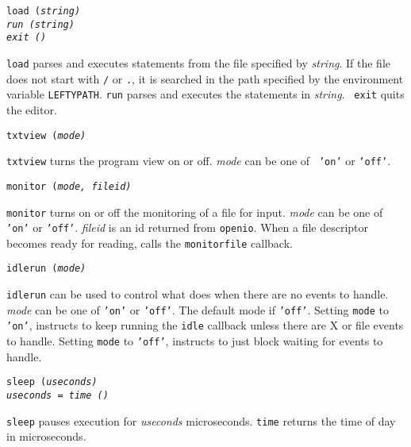 \begin{flushleft}
\tt load (\it string\tt )\\
\tt run (\it string\tt )\\
\tt exit ()\\
\end{flushleft}\vspace{-2\itemsep}
{\tt load} parses and executes {\LEFTY} statements from the file specified by
{\it string}. If the file does not start with {\tt /} or {\tt .}, it is
searched in the path specified by the environment variable {\tt LEFTYPATH}.
{\tt run} parses and executes the {\LEFTY} statements in {\it string}.  {\tt
exit} quits the editor.

\begin{flushleft}
\tt txtview (\it mode\tt )\\
\end{flushleft}\vspace{-2\itemsep}
{\tt txtview} turns the program view on or off. {\it mode} can be one of {\tt
'on'} or {\tt 'off'}.

\begin{flushleft}
\tt monitor (\it mode, fileid\tt )\\
\end{flushleft}\vspace{-2\itemsep}
{\tt monitor} turns on or off the monitoring of a file for input. {\it mode}
can be one of {\tt 'on'} or {\tt 'off'}. {\it fileid} is an id returned from
{\tt openio}. When a file descriptor becomes ready for reading, {\LEFTY} calls
the {\tt monitorfile} callback.

\begin{flushleft}
\tt idlerun (\it mode\tt )\\
\end{flushleft}\vspace{-2\itemsep}
{\tt idlerun} can be used to control what {\LEFTY} does when there are no
events to handle. {\it mode}
can be one of {\tt 'on'} or {\tt 'off'}. The default mode if {\tt 'off'}.
Setting {\tt mode} to {\tt 'on'}, instructs {\LEFTY} to keep running the
{\tt idle} callback unless there are X or file events to handle.
Setting {\tt mode} to {\tt 'off'}, instructs {\LEFTY} to just block waiting
for events to handle.

\begin{flushleft}
\tt sleep (\it useconds\tt )\\
\it useconds \tt = time ()\\
\end{flushleft}\vspace{-2\itemsep}
{\tt sleep} pauses execution for {\it useconds} microseconds.
{\tt time} returns the time of day in microseconds.

